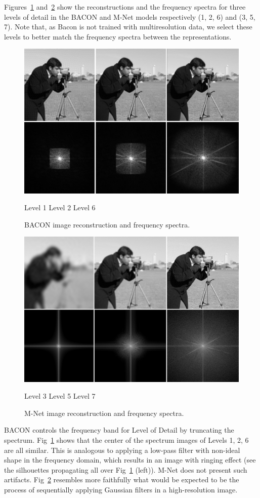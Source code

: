Figures~\ref{f:bacon} and~\ref{f:mnet} show the reconstructions and the frequency spectra for three levels of detail in the BACON and M-Net models respectively (1, 2, 6) and (3, 5, 7). Note that, as Bacon is not trained with multiresolution data, we select these levels to better match the frequency spectra between the representations.

\begin{figure}[!h]
\centering
\includegraphics[width=0.85\linewidth]{img/ch5/bacon-3.png}
\centerline{\small Level 1 \hfil Level 2 \hfil Level 6}
\caption{BACON image reconstruction and frequency spectra.}
\label{f:bacon}
\end{figure}

\begin{figure}[!h]
\centering
\includegraphics[width=0.85\linewidth]{img/ch5/m-net-3.png}
\centerline{\small Level 3 \hfil Level 5 \hfil Level 7}
\caption{M-Net image reconstruction and frequency spectra.}
\label{f:mnet}
\end{figure}


BACON controls the frequency band for Level of Detail by truncating the spectrum. Fig~\ref{f:bacon} shows that the center of the spectrum images of Levels 1, 2, 6 are all similar. This is analogous to applying a low-pass filter with non-ideal shape in the frequency domain, which results in an image with ringing effect (see the silhouettes propagating all over Fig~\ref{f:bacon} (left)). M-Net does not present such artifacts. Fig~\ref{f:mnet} resembles more faithfully what would be expected to be the process of sequentially applying Gaussian filters in a high-resolution image.

